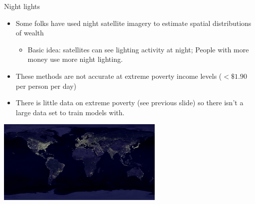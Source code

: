 \documentclass[mathserif, aspectratio=169]{beamer}
\begin{document}
\begin{frame}{Night lights}

	\begin{itemize}
		\item Some folks have used night satellite imagery to estimate spatial distributions of wealth
			\begin{itemize}
				\item Basic idea: satellites can see lighting activity at night; People with more money use more night lighting.  
			\end{itemize}
		\item These methods are not accurate at extreme poverty income levels ($<\$1.90$ per person per day)
		\item There is little data on extreme poverty (see previous slide) so there isn't a large data set to train models with.
	\end{itemize}
	\begin{center}
		\includegraphics[width=0.6\textwidth]{earth_lights_lrg}
	\end{center}
\end{frame}
\end{document}
